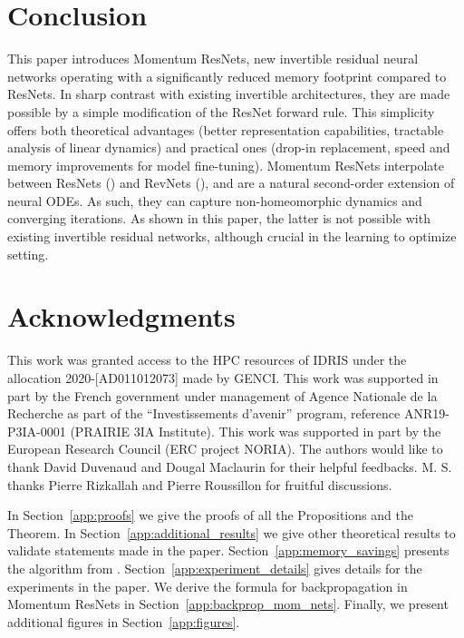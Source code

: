 \documentclass{article}
\begin{document}
\section*{Conclusion}

This paper introduces Momentum ResNets, new invertible residual neural networks operating with a significantly reduced memory footprint compared to ResNets. In sharp contrast with existing invertible architectures, they are made possible by a simple modification of the ResNet forward rule. This simplicity offers both theoretical advantages (better representation capabilities, tractable analysis of linear dynamics) and practical ones (drop-in replacement, speed and memory improvements for model fine-tuning). Momentum ResNets interpolate between ResNets () and RevNets (), and are a natural second-order extension of neural ODEs. As such, they can capture non-homeomorphic dynamics and converging iterations. As shown in this paper, the latter is not possible with existing invertible residual networks, although crucial in the learning to optimize setting.
\vspace{-2em}
\section*{Acknowledgments}

This work was granted access to the HPC resources of IDRIS under the allocation 2020-[AD011012073] made by GENCI. This work was supported in part by the French government under management of Agence Nationale de la Recherche as part of the “Investissements d’avenir” program, reference ANR19-P3IA-0001 (PRAIRIE 3IA Institute). This work was
supported in part by the European Research Council (ERC project NORIA).  The authors would like to thank David Duvenaud and Dougal Maclaurin for their helpful feedbacks.  M. S. thanks Pierre Rizkallah and Pierre Roussillon for fruitful discussions. 




\onecolumn

\appendix

In Section~\ref{app:proofs} we give the proofs of all the Propositions and the Theorem. In Section~\ref{app:additional_results} we give other theoretical results to validate statements made in the paper. Section~\ref{app:memory_savings} presents the algorithm from \citet{10.5555/3045118.3045343}.  Section~\ref{app:experiment_details} gives details for the experiments in the paper. We derive the formula for backpropagation in Momentum ResNets in Section~\ref{app:backprop_mom_nets}. Finally, we present additional figures in Section~\ref{app:figures}.
\end{document}
